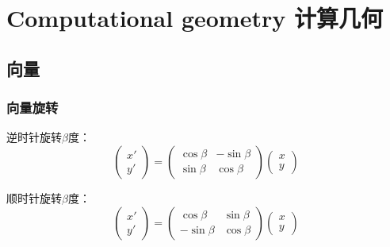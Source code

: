 \section{Computational geometry 计算几何}
\subsection{向量}
\subsubsection{向量旋转}
逆时针旋转$\beta$度：
\[
\left(
\begin{array}{ccc}
x' \\
y'
\end{array} \right)
=
\left(
\begin{array}{ccc}
\cos\beta & -\sin\beta \\
\sin\beta & \cos\beta
\end{array}
\right)
\left(
\begin{array}{ccc}
x \\
y
\end{array}
\right)
\]

顺时针旋转$\beta$度：
\[
\left(
\begin{array}{ccc}
x' \\
y'
\end{array} \right)
=
\left(
\begin{array}{ccc}
\cos\beta & \sin\beta \\
-\sin\beta & \cos\beta
\end{array}
\right)
\left(
\begin{array}{ccc}
x \\
y
\end{array}
\right)
\]
